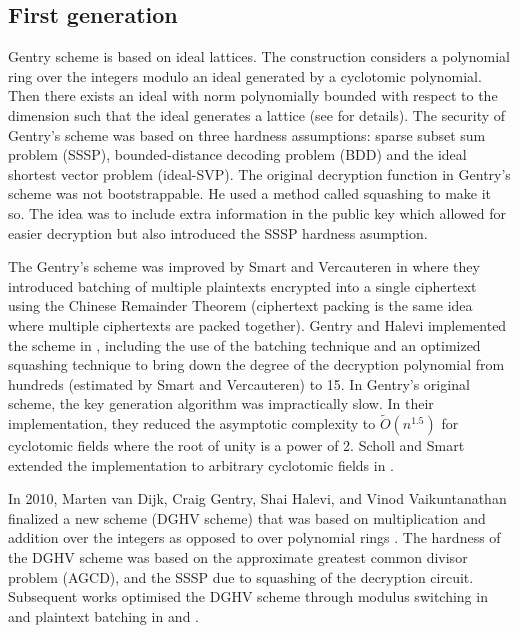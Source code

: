 \subsection*{First generation}
Gentry scheme is based on ideal lattices. The construction considers a polynomial ring over the integers modulo an ideal generated by a cyclotomic polynomial. Then there exists an ideal with norm polynomially bounded with respect to the dimension such that the ideal generates a lattice (see \cite{Gentry-Thesis} for details). The security of Gentry's scheme was based on three hardness assumptions: sparse subset sum problem (SSSP), bounded-distance decoding problem (BDD) and the ideal shortest vector problem (ideal-SVP). The original decryption function in Gentry's scheme was not bootstrappable. He used a method called squashing to make it so. The idea was to include extra information in the public key which allowed for easier decryption but also introduced the SSSP hardness asumption.

The Gentry's scheme was improved by Smart and Vercauteren in \cite{SV09-batch} where they introduced batching of multiple plaintexts encrypted into a single ciphertext using the Chinese Remainder Theorem (ciphertext packing is the same idea where multiple ciphertexts are packed together). Gentry and Halevi implemented the scheme in \cite{GS10-impl}, including the use of the batching technique and an optimized squashing technique to bring down the degree of the decryption polynomial from hundreds (estimated by Smart and Vercauteren) to 15. In Gentry's original scheme, the key generation algorithm was impractically slow. In their implementation, they reduced the asymptotic complexity to $\tilde{O}\left(n^{1.5}\right)$ for cyclotomic fields where the root of unity is a power of 2. Scholl and Smart extended the implementation to arbitrary cyclotomic fields in \cite{SS11-keygen}.

In 2010, Marten van Dijk, Craig Gentry, Shai Halevi, and Vinod Vaikuntanathan finalized a new scheme (DGHV scheme) that was based on multiplication and addition over the integers as opposed to over polynomial rings \cite{DGHV10}. The hardness of the DGHV scheme was based on the approximate greatest common divisor problem (AGCD), and the SSSP due to squashing of the decryption circuit. Subsequent works optimised the DGHV scheme through modulus switching in \cite{DGHV-modswitch} and plaintext batching in \cite{DGHV-batch1} and \cite{DGHV-batch2}.


